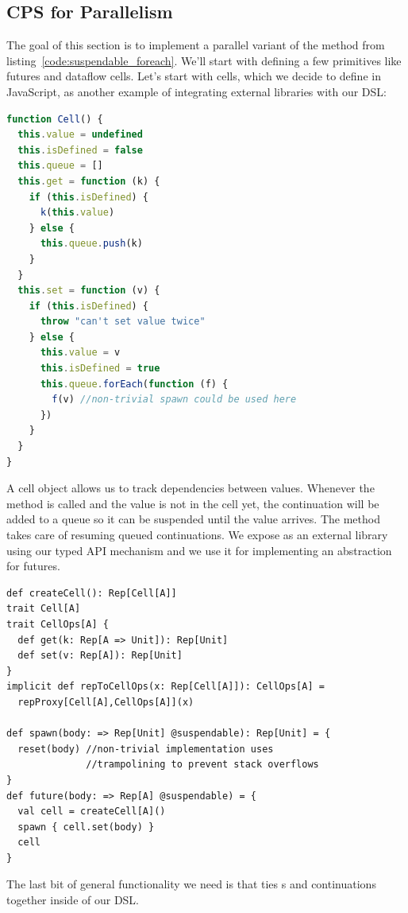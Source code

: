 \documentclass[runningheads,a4paper]{llncs}
\begin{document}
\subsection{CPS for Parallelism}
The goal of this section is to implement a parallel variant of the
 method from listing~\ref{code:suspendable_foreach}. We'll start 
with defining a few primitives like futures and dataflow cells. 
Let's start with cells, which we
decide to define in JavaScript, as another example of
integrating external libraries with our DSL:

\begin{lstlisting}[language=JavaScript,caption=JavaScript-based implementation of a non-blocking Cell]
function Cell() {
  this.value = undefined
  this.isDefined = false
  this.queue = []
  this.get = function (k) {
    if (this.isDefined) {
      k(this.value)
    } else {
      this.queue.push(k)
    }
  }
  this.set = function (v) {
    if (this.isDefined) {
      throw "can't set value twice"
    } else {
      this.value = v
      this.isDefined = true
      this.queue.forEach(function (f) { 
        f(v) //non-trivial spawn could be used here
      })
    }
  }
}
\end{lstlisting}

A cell object allows us to track dependencies between values. Whenever the  method is called and the value is not in the cell yet, the continuation will be added to a queue so it can be suspended until the value arrives. The  method takes care of resuming queued continuations. We expose  as an external library using our typed API mechanism and we use it for implementing an abstraction for futures.

\begin{lstlisting}
def createCell(): Rep[Cell[A]]
trait Cell[A]
trait CellOps[A] {
  def get(k: Rep[A => Unit]): Rep[Unit]
  def set(v: Rep[A]): Rep[Unit]
}
implicit def repToCellOps(x: Rep[Cell[A]]): CellOps[A] =
  repProxy[Cell[A],CellOps[A]](x)

def spawn(body: => Rep[Unit] @suspendable): Rep[Unit] = {
  reset(body) //non-trivial implementation uses
              //trampolining to prevent stack overflows
}
def future(body: => Rep[A] @suspendable) = {
  val cell = createCell[A]()
  spawn { cell.set(body) }
  cell
}
\end{lstlisting}

The last bit of general functionality we need is  that ties s and continuations together inside of our DSL.
\end{document}
